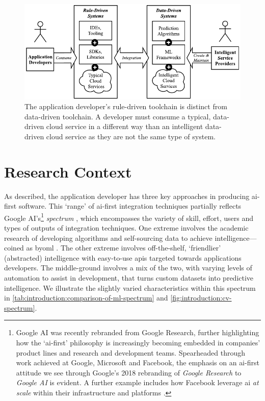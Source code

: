 \begin{figure}
\centering
\caption[Differences between data- and rule-driven cloud services]{The application developer's rule-driven toolchain is distinct from data-driven toolchain. A developer must consume a typical, data-driven cloud service in a different way than an intelligent data-driven cloud service as they are not the same type of system.}
\label{fig:introduction:rule-vs-data}
\includegraphics{rule-vs-data}
\end{figure}

\section{Research Context}
\label{sec:introduction:context}



As described, the application developer has three key approaches in producing \gls{ai}-first software. This `range' of \gls{ai}-first integration techniques partially reflects Google AI's\footnote{
Google AI was recently rebranded from Google Research, further highlighting how the `\gls{ai}-first' philosophy is increasingly becoming embedded in companies' product lines and research and development teams. Spearheaded through work achieved at Google, Microsoft and Facebook, the emphasis on an \gls{ai}-first attitude we see through Google's 2018 rebranding of \textit{Google Research} to \textit{Google AI} \citep{Howard:2018tz} is evident. A further example includes how Facebook leverage \gls{ai} \textit{at scale} within their infrastructure and platforms \citep{Parekh:2017hx}.
} 
\textit{ spectrum} \citep{Ortiz:2017wg,LaForge:2018tm,McGowen:2019vt}, which encompasses the variety of skill, effort, users and types of outputs of integration techniques. One extreme involves the academic research of developing algorithms and self-sourcing data to achieve intelligence---coined as \gls{byoml} \citep{Ortiz:2017wg,McGowen:2019vt,Jimerson:2017vh}. The other extreme involves off-the-shelf, `friendlier' (abstracted) intelligence with easy-to-use \glspl{api} targeted towards applications developers. The middle-ground involves a mix of the two, with varying levels of automation to assist in development, that turns custom datasets into predictive intelligence. 
We illustrate the slightly varied characteristics within this spectrum in \cref{tab:introduction:comparison-of-ml-spectrum} and \cref{fig:introduction:cv-spectrum}.

